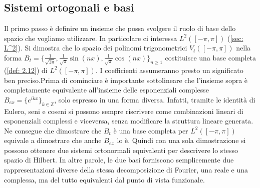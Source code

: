 \documentclass[a4paper,12pt]{report}
\begin{document}
\subsection{Sistemi ortogonali e basi}

Il primo passo è definire un insieme che possa svolgere il ruolo di base dello spazio che vogliamo utilizzare. In particolare ci interessa $L^2([-\pi,\pi])$ (\ref{sec: L^2}). Si dimostra che lo spazio dei polinomi trigonometrici $V_t([-\pi,\pi])$ nella forma $B_t=\bigg\{\displaystyle\frac{1}{\sqrt{2\pi}}, \frac{1}{\sqrt{\pi}}\sin({nx}), \frac{1}{\sqrt{\pi}}\cos({nx})\bigg\}_{n\geq 1}$ costituisce una base  completa (\ref{def: 2.12}) di $L^2([-\pi,\pi])$. I coefficienti assumeranno presto un significato ben preciso.Prima di cominciare è importante sottolineare che l'insieme sopra è completamente equivalente all'insieme delle esponenziali complesse $B_{ex}=\{e^{ikx}\}_{k\in \mathbb{Z}}$, solo espresso in una forma diversa. Infatti, tramite le identità di Eulero, seni e coseni si possono sempre riscrivere come combinazioni lineari di esponenziali complessi e viceversa, senza modificare la struttura lineare generata. Ne consegue che dimostrare che $B_t$ è una base completa per $L^2([-\pi,\pi])$ equivale a dimostrare che anche $B_{ex}$ lo è. Quindi con una sola dimostrazione si possono ottenere due sistemi ortonormali equivalenti per descrivere lo stesso spazio di Hilbert. In altre parole, le due basi forniscono semplicemente due rappresentazioni diverse della stessa decomposizione di Fourier, una reale e una complessa, ma del tutto equivalenti dal punto di vista funzionale.
\end{document}
